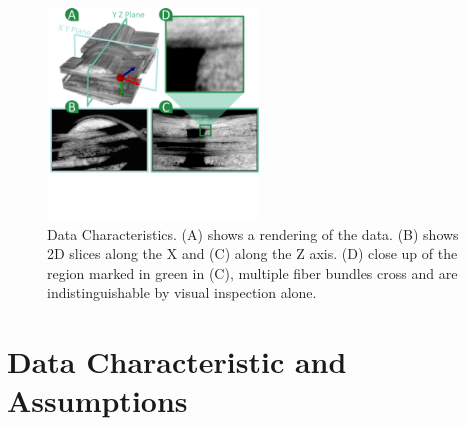 \begin{figure}[tb]
\centering
\includegraphics[width=0.5\textwidth]{imagesMT2014/image1B}
\caption{Data Characteristics. (A) shows a rendering of the data. (B) shows 2D slices along the X and (C) along the Z axis. (D) close up of the region marked in green in (C), multiple fiber bundles cross and are indistinguishable by visual inspection alone. }
\label{fig:data-char}
\end{figure}
\section {Data Characteristic and Assumptions}
\label{sec:char_data}

